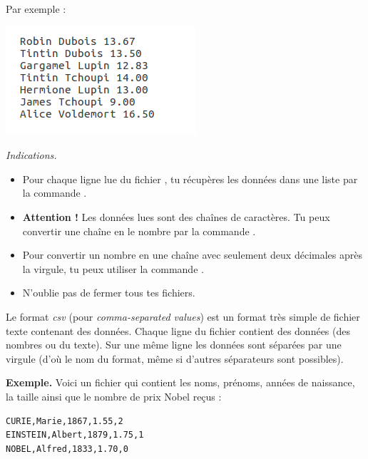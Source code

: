 \documentclass[11pt,class=report,crop=false]{standalone}
\begin{document}
\begin{activite}
\begin{enumerate}
    Par exemple :
\begin{center}
\includegraphics[scale=0.7]{ecran-fichiers-1b}
\end{center}  

  \emph{Indications.}
  \begin{itemize}
    	\item Pour chaque ligne lue du fichier , tu récupères les données dans  une liste par la commande .
    	
    	\item \textbf{Attention !} Les données lues sont des chaînes de caractères. Tu peux convertir une chaîne  en le nombre  par la commande .
    	
    	\item Pour convertir un nombre en une chaîne avec seulement deux décimales après la virgule, tu peux utiliser la commande .
    	
    	\item N'oublie pas de fermer tous tes fichiers.
    	
   \end{itemize}
    
\end{enumerate}   
     
\end{activite}



\begin{cours}
Le format \emph{csv} (pour  \emph{comma-separated values}) est un format très simple de fichier texte contenant des données.
Chaque ligne du fichier contient des données (des nombres ou du texte). Sur une même ligne les données sont séparées par une virgule (d'où le nom du format, même si d'autres séparateurs sont possibles).

\textbf{Exemple.} Voici un fichier qui contient les noms, prénoms, années de naissance, la taille ainsi que le nombre de prix Nobel reçus :
 \begin{center}
\begin{minipage}{0.4\textwidth}
\begin{lstlisting}
CURIE,Marie,1867,1.55,2
EINSTEIN,Albert,1879,1.75,1
NOBEL,Alfred,1833,1.70,0
\end{lstlisting}
\end{minipage}
\end{center}

\end{cours}
\end{document}
